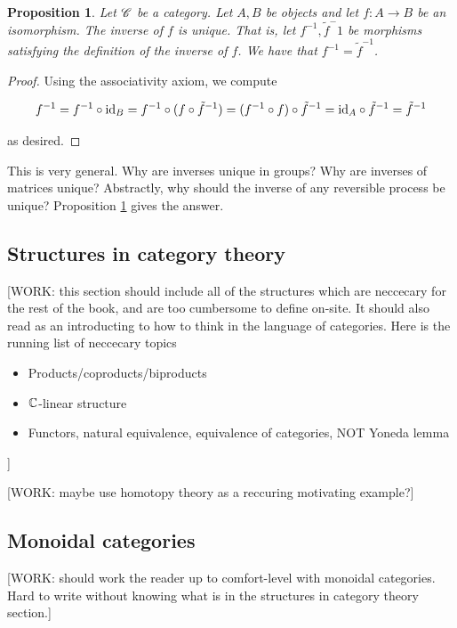 \documentclass{article}
\newtheorem{proposition}{Proposition}[section]
\theoremstyle{definition}
\numberwithin{figure}{section}
\begin{document}
\begin{proposition}
\label{inverse-unique}
Let $\mathscr{C}$ be a category. Let $A,B$ be objects and let $f:A\to B$ be an isomorphism. The inverse of $f$ is unique. That is, let $f^{-1},\tilde{f}^-1$ be morphisms satisfying the definition of the inverse of $f$. We have that $f^{-1}=\tilde{f}^{-1}$.
\end{proposition}
\begin{proof} Using the associativity axiom, we compute

$$f^{-1}=f^{-1}\circ \mathrm{id} _{B} = f^{-1}\circ (f \circ \tilde{f}^{-1})=(f^{-1}\circ f)\circ \tilde{f}^{-1}=\mathrm{id}_A \circ \tilde{f}^{-1}=\tilde{f}^{-1}$$

as desired.
\end{proof}

This is very general. Why are inverses unique in groups? Why are inverses of matrices unique? Abstractly, why should the inverse of any reversible process be unique? Proposition \ref{inverse-unique} gives the answer.

\subsection{Structures in category theory}

[WORK: this section should include all of the structures which are neccecary for the rest of the book,
and are too cumbersome to define on-site. It should also read as an introducting to how to think in the language of categories. Here is the running list of neccecary topics

\begin{itemize}
\item Products/coproducts/biproducts
\item $\mathbb{C}$-linear structure
\item Functors, natural equivalence, equivalence of categories, NOT Yoneda lemma
\end{itemize}
]

[WORK: maybe use homotopy theory as a reccuring motivating example?]

\subsection{Monoidal categories}

[WORK: should work the reader up to comfort-level with monoidal categories. Hard to write without knowing what is in the structures in category theory section.]
\end{document}
